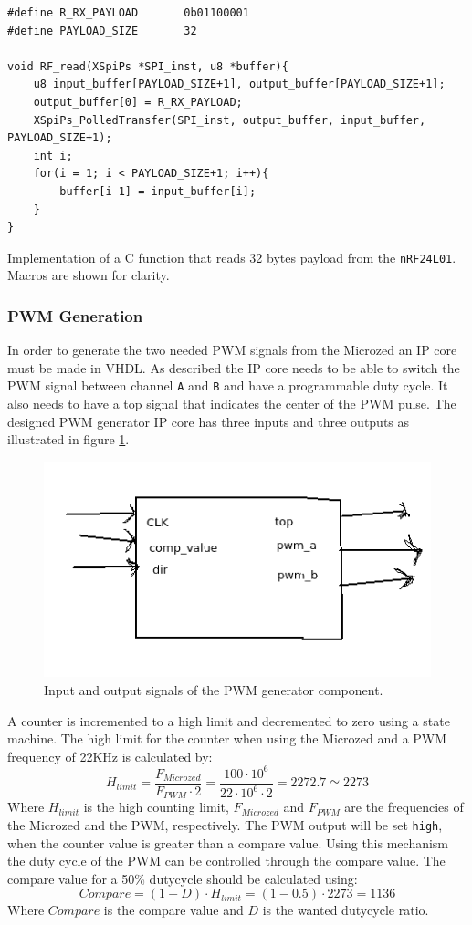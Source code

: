 \begin{listing}[h]
\begin{verbatim}
#define R_RX_PAYLOAD       0b01100001
#define PAYLOAD_SIZE       32

void RF_read(XSpiPs *SPI_inst, u8 *buffer){
	u8 input_buffer[PAYLOAD_SIZE+1], output_buffer[PAYLOAD_SIZE+1];
	output_buffer[0] = R_RX_PAYLOAD;
	XSpiPs_PolledTransfer(SPI_inst, output_buffer, input_buffer, PAYLOAD_SIZE+1);
	int i;
	for(i = 1; i < PAYLOAD_SIZE+1; i++){
		buffer[i-1] = input_buffer[i];
	}
}
\end{verbatim}
\caption{Implementation of a C function that reads 32 bytes payload from the \texttt{nRF24L01}. Macros are shown for clarity.}
\label{code:rf_read_payload}
\end{listing}

\subsubsection{PWM Generation} %
\label{ssub:pwm_generation}
In order to generate the two needed PWM signals from the Microzed an IP core must be made in VHDL.
As described the IP core needs to be able to switch the PWM signal between channel \texttt{A} and \texttt{B} and have a programmable duty cycle.
It also needs to have a top signal that indicates the center of the PWM pulse.
The designed PWM generator IP core has three inputs and three outputs as illustrated in figure \ref{fig:pwm_gen_component}.

\begin{figure}[h]
	\centering
	\includegraphics[width=.4\linewidth]{graphics/pwm_gen_component.png}
	\caption{Input and output signals of the PWM generator component.}
	\label{fig:pwm_gen_component}
\end{figure}
A counter is incremented to a high limit and decremented to zero using a state machine.
The high limit for the counter when using the Microzed and a PWM frequency of 22KHz is calculated by:
\begin{equation}
	H_{limit} = \frac{F_{Microzed}}{F_{PWM}\cdot 2} = \frac{100\cdot 10^6}{22\cdot 10^6 \cdot 2} = 2272.7 \simeq 2273
\end{equation}
Where $H_{limit}$ is the high counting limit, $F_{Microzed}$ and $F_{PWM}$ are the frequencies of the Microzed and the PWM, respectively. 
The PWM output will be set \texttt{high}, when the counter value is greater than a compare value.
Using this mechanism the duty cycle of the PWM can be controlled through the compare value.
The compare value for a 50\% dutycycle should be calculated using:
\begin{equation}
	Compare = (1 - D) \cdot H_{limit} = (1 - 0.5) \cdot 2273 = 1136
\end{equation}
Where $Compare$ is the compare value and $D$ is the wanted dutycycle ratio.

